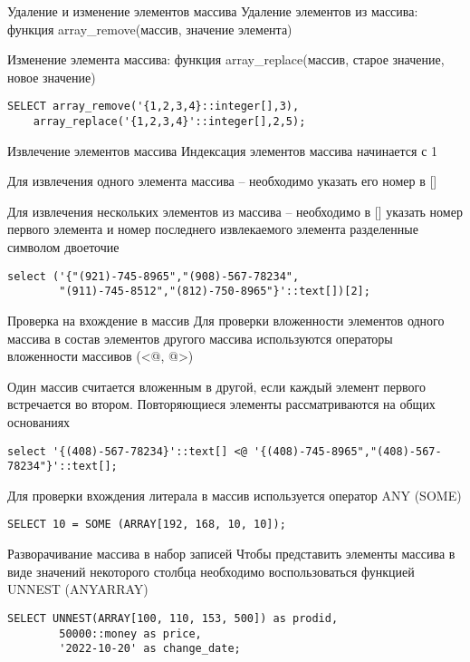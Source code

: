 \documentclass[12pt]{article}
\begin{document}
\begin{Example}{Удаление и изменение элементов массива}
    Удаление элементов из массива: функция array\_remove(массив, значение элемента)

    Изменение элемента массива: функция array\_replace(массив, старое значение, новое значение)

\begin{lstlisting}
SELECT array_remove('{1,2,3,4}::integer[],3),
    array_replace('{1,2,3,4}'::integer[],2,5);
\end{lstlisting}
\end{Example}

\begin{Example}{Извлечение элементов массива}
    Индексация элементов массива начинается с 1 

    Для извлечения одного элемента массива -- необходимо указать его номер в []

    Для извлечения нескольких элементов из массива -- необходимо в [] указать номер первого элемента и номер последнего извлекаемого элемента разделенные символом двоеточие

\begin{lstlisting}
select ('{"(921)-745-8965","(908)-567-78234",
        "(911)-745-8512","(812)-750-8965"}'::text[])[2];
\end{lstlisting}
\end{Example}

\begin{Example}{Проверка на вхождение в массив}
    Для проверки вложенности элементов одного массива в состав элементов другого массива используются операторы вложенности массивов (<@, @>)

    Один массив считается вложенным в другой, если каждый элемент первого встречается во втором. Повторяющиеся элементы рассматриваются на общих основаниях

\begin{lstlisting}
select '{(408)-567-78234}'::text[] <@ '{(408)-745-8965","(408)-567-78234"}'::text[];
\end{lstlisting}

    Для проверки вхождения литерала в массив используется оператор ANY (SOME)

\begin{lstlisting}
SELECT 10 = SOME (ARRAY[192, 168, 10, 10]);
\end{lstlisting}
\end{Example}

\begin{Example}{Разворачивание массива в набор записей}
    Чтобы представить элементы массива в виде значений некоторого столбца необходимо воспользоваться функцией UNNEST (ANYARRAY)

\begin{lstlisting}
SELECT UNNEST(ARRAY[100, 110, 153, 500]) as prodid,
        50000::money as price,
        '2022-10-20' as change_date;
\end{lstlisting}
\end{Example}
\end{document}
